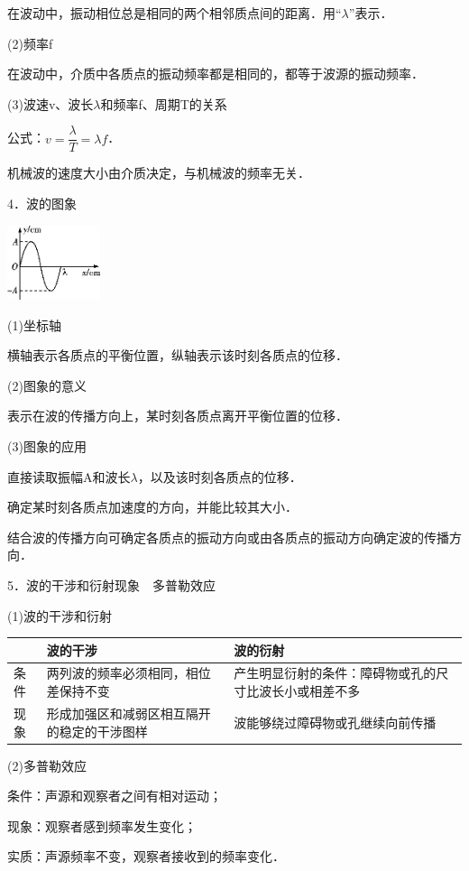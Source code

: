 在波动中，振动相位总是相同的两个相邻质点间的距离．用``$\lambda$''表示．

(2)频率f

在波动中，介质中各质点的振动频率都是相同的，都等于波源的振动频率．

(3)波速v、波长$\lambda$和频率f、周期T的关系

公式：$v=\dfrac{\lambda}{T}=\lambda f$．

机械波的速度大小由介质决定，与机械波的频率无关．

4．波的图象

\begin{center}\includegraphics[width=1.07569in,height=0.85833in]{media/image526.png}\end{center}

(1)坐标轴

横轴表示各质点的平衡位置，纵轴表示该时刻各质点的位移．

(2)图象的意义

表示在波的传播方向上，某时刻各质点离开平衡位置的位移．

(3)图象的应用

直接读取振幅A和波长$\lambda$，以及该时刻各质点的位移．

确定某时刻各质点加速度的方向，并能比较其大小．

结合波的传播方向可确定各质点的振动方向或由各质点的振动方向确定波的传播方向．

5．波的干涉和衍射现象　多普勒效应

(1)波的干涉和衍射

\begin{longtable}[]{@{}m{1cm}m{4cm}m{5cm}@{}}
\toprule
& 波的干涉 & 波的衍射\tabularnewline
\midrule
\endhead
条件 & 两列波的频率必须相同，相位差保持不变 &
产生明显衍射的条件：障碍物或孔的尺寸比波长小或相差不多\tabularnewline
现象 & 形成加强区和减弱区相互隔开的稳定的干涉图样 &
波能够绕过障碍物或孔继续向前传播\tabularnewline
\bottomrule
\end{longtable}

(2)多普勒效应

条件：声源和观察者之间有相对运动；

现象：观察者感到频率发生变化；

实质：声源频率不变，观察者接收到的频率变化．

